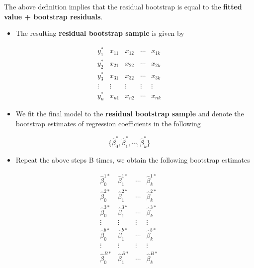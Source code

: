 \documentclass[
]{book}
\providecommand{\tightlist}{%
  \setlength{\itemsep}{0pt}\setlength{\parskip}{0pt}}
\begin{document}
The above definition implies that the residual bootstrap is equal to the \textbf{fitted value + bootstrap residuals}.

\begin{itemize}
\tightlist
\item
  The resulting \textbf{residual bootstrap sample} is given by
\end{itemize}

\[
\begin{array}{cccccc} 
y_1^{*} &  x_{11} &  x_{12} & \cdots & x_{1k}  \\
y_2^{*} &  x_{21} &  x_{22} & \cdots & x_{2k}  \\
y_3^{*} &  x_{31} &  x_{32} & \cdots & x_{3k}  \\
\vdots  &  \vdots &  \vdots & \vdots & \vdots  \\
y_n^{*} &  x_{n1} &  x_{n2} & \cdots & x_{nk} 
\end{array}
\]

\begin{itemize}
\tightlist
\item
  We fit the final model to the \textbf{residual bootstrap sample} and denote the bootstrap estimates of regression coefficients in the following
\end{itemize}

\[
\{ \hat{\beta}_0^{*}, \hat{\beta}_1^{*},  \cdots, \hat{\beta}_k^{*} \}
\]

\begin{itemize}
\tightlist
\item
  Repeat the above steps B times, we obtain the following bootstrap estimates
\end{itemize}

\[
\begin{array}{cccccc} 
\hat{\beta}_0^{1*} & \hat{\beta}_1^{1*} &  \cdots  & \hat{\beta}_k^{1*}  \\
\hat{\beta}_0^{2*} & \hat{\beta}_1^{2*} &  \cdots  & \hat{\beta}_k^{2*}  \\
\hat{\beta}_0^{3*} & \hat{\beta}_1^{3*} &  \cdots  & \hat{\beta}_k^{3*}  \\
\vdots  &  \vdots &  \vdots & \vdots  \\
\hat{\beta}_0^{b*} & \hat{\beta}_1^{b*} &  \cdots  & \hat{\beta}_k^{b*}  \\
\vdots  &  \vdots &  \vdots & \vdots  \\
\hat{\beta}_0^{B*} & \hat{\beta}_1^{B*} &  \cdots  & \hat{\beta}_k^{B*}  \\
\end{array}
\]
\end{document}
